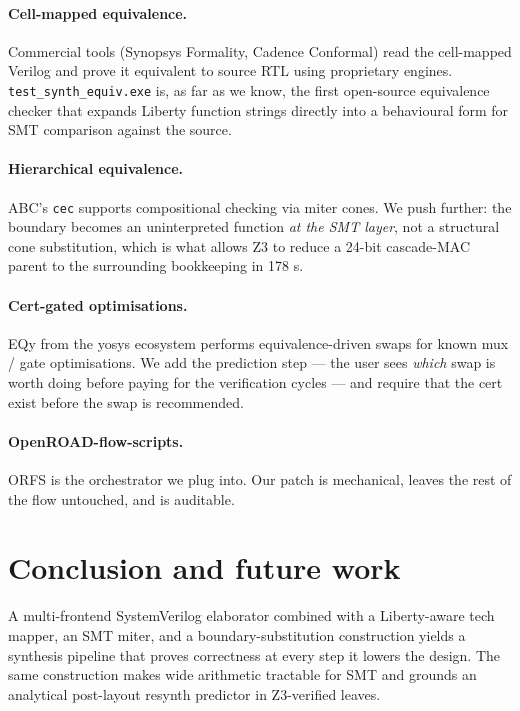 \documentclass[11pt,a4paper]{article}
\begin{document}
\paragraph{Cell-mapped equivalence.} Commercial tools
(Synopsys Formality, Cadence Conformal) read the cell-mapped
Verilog and prove it equivalent to source RTL using
proprietary engines.  \texttt{test\_synth\_equiv.exe} is, as far
as we know, the first open-source equivalence checker that
expands Liberty function strings directly into a behavioural
form for SMT comparison against the source.

\paragraph{Hierarchical equivalence.}  ABC's \texttt{cec}
supports compositional checking via miter cones.  We push
further: the boundary becomes an uninterpreted function
\emph{at the SMT layer}, not a structural cone substitution,
which is what allows Z3 to reduce a 24-bit cascade-MAC parent to
the surrounding bookkeeping in 178 s.

\paragraph{Cert-gated optimisations.}  EQy \cite{eqy} from the
yosys ecosystem performs equivalence-driven swaps for known
mux / gate optimisations.  We add the prediction step --- the user
sees \emph{which} swap is worth doing before paying for the
verification cycles --- and require that the cert exist before
the swap is recommended.

\paragraph{OpenROAD-flow-scripts.}  ORFS is the orchestrator we
plug into.  Our patch is mechanical, leaves the rest of the flow
untouched, and is auditable.

\section{Conclusion and future work}

A multi-frontend SystemVerilog elaborator combined with a
Liberty-aware tech mapper, an SMT miter, and a boundary-substitution
construction yields a synthesis pipeline that proves correctness
at every step it lowers the design.  The same construction makes
wide arithmetic tractable for SMT and grounds an analytical
post-layout resynth predictor in Z3-verified leaves.
\end{document}

